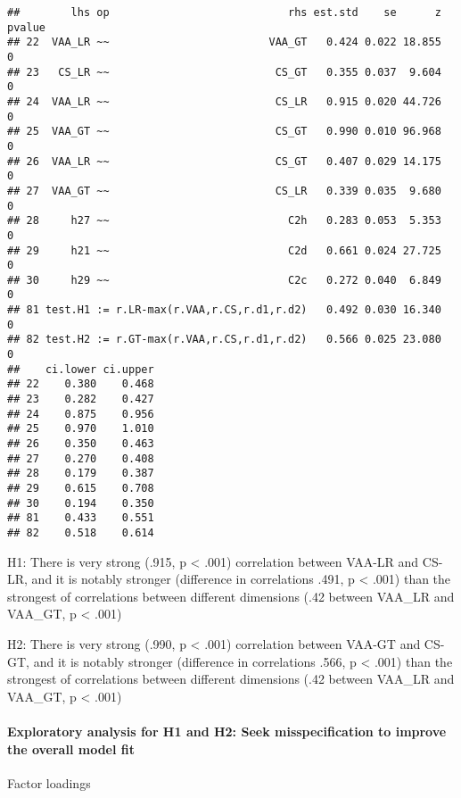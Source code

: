 \documentclass[
]{article}
\begin{document}
\begin{verbatim}
##        lhs op                            rhs est.std    se      z pvalue
## 22  VAA_LR ~~                         VAA_GT   0.424 0.022 18.855      0
## 23   CS_LR ~~                          CS_GT   0.355 0.037  9.604      0
## 24  VAA_LR ~~                          CS_LR   0.915 0.020 44.726      0
## 25  VAA_GT ~~                          CS_GT   0.990 0.010 96.968      0
## 26  VAA_LR ~~                          CS_GT   0.407 0.029 14.175      0
## 27  VAA_GT ~~                          CS_LR   0.339 0.035  9.680      0
## 28     h27 ~~                            C2h   0.283 0.053  5.353      0
## 29     h21 ~~                            C2d   0.661 0.024 27.725      0
## 30     h29 ~~                            C2c   0.272 0.040  6.849      0
## 81 test.H1 := r.LR-max(r.VAA,r.CS,r.d1,r.d2)   0.492 0.030 16.340      0
## 82 test.H2 := r.GT-max(r.VAA,r.CS,r.d1,r.d2)   0.566 0.025 23.080      0
##    ci.lower ci.upper
## 22    0.380    0.468
## 23    0.282    0.427
## 24    0.875    0.956
## 25    0.970    1.010
## 26    0.350    0.463
## 27    0.270    0.408
## 28    0.179    0.387
## 29    0.615    0.708
## 30    0.194    0.350
## 81    0.433    0.551
## 82    0.518    0.614
\end{verbatim}

H1: There is very strong (.915, p \textless{} .001) correlation between
VAA-LR and CS-LR, and it is notably stronger (difference in correlations
.491, p \textless{} .001) than the strongest of correlations between
different dimensions (.42 between VAA\_LR and VAA\_GT, p \textless{}
.001)

H2: There is very strong (.990, p \textless{} .001) correlation between
VAA-GT and CS-GT, and it is notably stronger (difference in correlations
.566, p \textless{} .001) than the strongest of correlations between
different dimensions (.42 between VAA\_LR and VAA\_GT, p \textless{}
.001)

\newpage

\hypertarget{exploratory-analysis-for-h1-and-h2-seek-misspecification-to-improve-the-overall-model-fit}{%
\paragraph{Exploratory analysis for H1 and H2: Seek misspecification to
improve the overall model
fit}\label{exploratory-analysis-for-h1-and-h2-seek-misspecification-to-improve-the-overall-model-fit}}

Factor loadings
\end{document}
